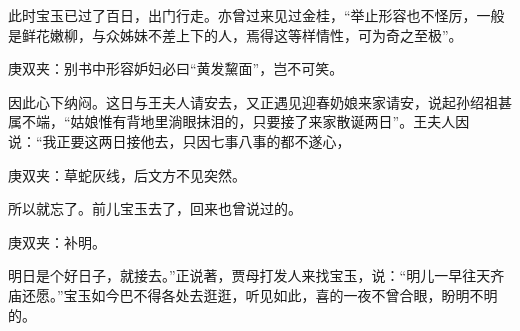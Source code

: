 \begin{parag}
    此时宝玉已过了百日，出门行走。亦曾过来见过金桂，“举止形容也不怪厉，一般是鲜花嫩柳，与众姊妹不差上下的人，焉得这等样情性，可为奇之至极”。\begin{note}庚双夹：别书中形容妒妇必曰“黄发黧面”，岂不可笑。\end{note}因此心下纳闷。这日与王夫人请安去，又正遇见迎春奶娘来家请安，说起孙绍祖甚属不端，“姑娘惟有背地里淌眼抹泪的，只要接了来家散诞两日”。王夫人因说：“我正要这两日接他去，只因七事八事的都不遂心，\begin{note}庚双夹：草蛇灰线，后文方不见突然。\end{note}所以就忘了。前儿宝玉去了，回来也曾说过的。\begin{note}庚双夹：补明。\end{note}明日是个好日子，就接去。”正说著，贾母打发人来找宝玉，说：“明儿一早往天齐庙还愿。”宝玉如今巴不得各处去逛逛，听见如此，喜的一夜不曾合眼，盼明不明的。
\end{parag}


